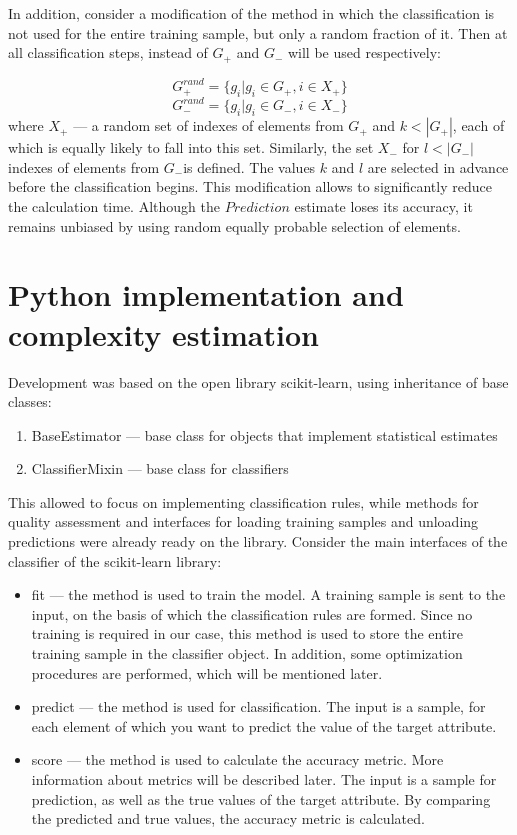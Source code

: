 \documentclass{article}
\begin{document}
In addition, consider a modification of the method in which the classification is not used for the entire training sample, but only a random fraction of it. Then at all classification steps, instead of $G_+$ and $G_-$ will be used respectively:

$$G_+^{rand} = \{ g_i | g_i \in G_+, i \in X_+\}$$
$$G_-^{rand} = \{ g_i | g_i \in G_-, i \in X_-\}$$
where $X_+$ --- a random set of indexes of elements from $G_+$ and $k < |G_+|$, each of which is equally likely to fall into this set. Similarly, the set $X_-$ for $l < |G_-|$ indexes of elements from $G_-$is defined. The values $k$ and $l$ are selected in advance before the classification begins. This modification allows to significantly reduce the calculation time. Although the $Prediction$ estimate loses its accuracy, it remains unbiased by using random equally probable selection of elements.

\section{Python implementation and complexity estimation}

Development was based on the open library scikit-learn, using inheritance of base classes:

\begin{enumerate}
    \item BaseEstimator --- base class for objects that implement statistical estimates
    \item ClassifierMixin --- base class for classifiers
\end{enumerate}

This allowed to focus on implementing classification rules, while methods for quality assessment and interfaces for loading training samples and unloading predictions were already ready on the library. Consider the main interfaces of the classifier of the scikit-learn library:

\begin{itemize}
    \item fit --- the method is used to train the model. A training sample is sent to the input, on the basis of which the classification rules are formed. Since no training is required in our case, this method is used to store the entire training sample in the classifier object. In addition, some optimization procedures are performed, which will be mentioned later.
    \item predict --- the method is used for classification. The input is a sample, for each element of which you want to predict the value of the target attribute.
    \item score --- the method is used to calculate the accuracy metric.  More information about metrics will be described later. The input is a sample for prediction, as well as the true values of the target attribute. By comparing the predicted and true values, the accuracy metric is calculated.
\end{itemize}
\end{document}
